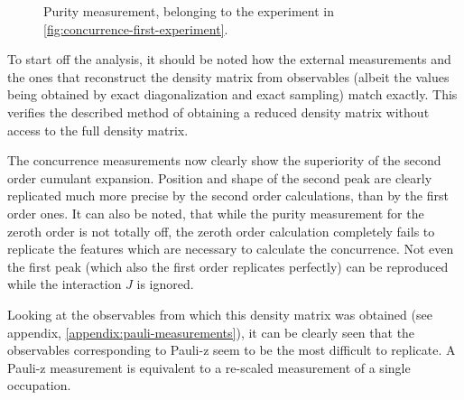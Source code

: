\begin{figure}[htbp]
    \centering
    \vspace{-0.3cm}
    \caption{
            Purity measurement, belonging to the experiment in \autoref{fig:concurrence-first-experiment}.
        }
    \label{fig:purity-first-experiment}
\end{figure}

To start off the analysis, it should be noted how the external measurements and the ones that reconstruct the density matrix from observables (albeit the values being obtained by exact diagonalization and exact sampling) match exactly.
This verifies the described method of obtaining a reduced density matrix without access to the full density matrix.

The concurrence measurements now clearly show the superiority of the second order cumulant expansion.
Position and shape of the second peak are clearly replicated much more precise by the second order calculations, than by the first order ones.
It can also be noted, that while the purity measurement for the zeroth order is not totally off, the zeroth order calculation completely fails to replicate the features which are necessary to calculate the concurrence.
Not even the first peak (which also the first order replicates perfectly) can be reproduced while the interaction $J$ is ignored.

Looking at the observables from which this density matrix was obtained (see appendix, \ref{appendix:pauli-measurements}), it can be clearly seen that the observables corresponding to Pauli-z seem to be the most difficult to replicate.
A Pauli-z measurement is equivalent to a re-scaled measurement of a single occupation.
